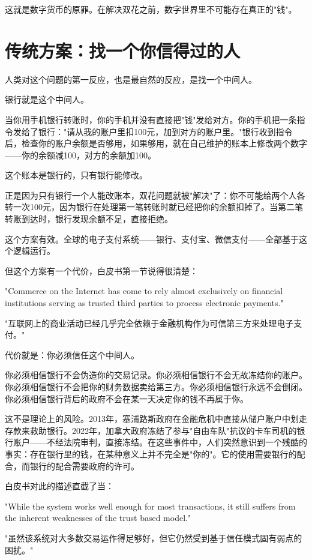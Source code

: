 \documentclass[a4paper,12pt,openany]{ctexbook}
\newenvironment{quoting}{%
  \par\vspace{0.5em}%
  \begin{list}{}{%
    \setlength{\leftmargin}{2em}%
    \setlength{\rightmargin}{2em}%
    \setlength{\parsep}{0.3em}%
    \setlength{\itemsep}{0pt}%
    \setlength{\topsep}{0pt}%
  }%
  \item\relax
}{%
  \end{list}%
  \par\vspace{0.5em}%
}
\begin{document}
这就是数字货币的原罪。在解决双花之前，数字世界里不可能存在真正的"钱"。


\section*{传统方案：找一个你信得过的人}


人类对这个问题的第一反应，也是最自然的反应，是找一个中间人。

银行就是这个中间人。

当你用手机银行转账时，你的手机并没有直接把"钱"发给对方。你的手机把一条指令发给了银行："请从我的账户里扣100元，加到对方的账户里。"银行收到指令后，检查你的账户余额是否够用，如果够用，就在自己维护的账本上修改两个数字——你的余额减100，对方的余额加100。

这个账本是银行的，只有银行能修改。

正是因为只有银行一个人能改账本，双花问题就被"解决"了：你不可能给两个人各转一次100元，因为银行在处理第一笔转账时就已经把你的余额扣掉了。当第二笔转账到达时，银行发现余额不足，直接拒绝。

这个方案有效。全球的电子支付系统——银行、支付宝、微信支付——全部基于这个逻辑运行。

但这个方案有一个代价，白皮书第一节说得很清楚：


\begin{quoting}
\small
"Commerce on the Internet has come to rely almost exclusively on financial institutions serving as trusted third parties to process electronic payments."

"互联网上的商业活动已经几乎完全依赖于金融机构作为可信第三方来处理电子支付。"
\end{quoting}


代价就是：你必须信任这个中间人。

你必须相信银行不会伪造你的交易记录。你必须相信银行不会无故冻结你的账户。你必须相信银行不会把你的财务数据卖给第三方。你必须相信银行永远不会倒闭。你必须相信银行背后的政府不会在某一天决定你的钱不再属于你。

这不是理论上的风险。2013年，塞浦路斯政府在金融危机中直接从储户账户中划走存款来救助银行。2022年，加拿大政府冻结了参与"自由车队"抗议的卡车司机的银行账户——不经法院审判，直接冻结。在这些事件中，人们突然意识到一个残酷的事实：存在银行里的钱，在某种意义上并不完全是"你的"。它的使用需要银行的配合，而银行的配合需要政府的许可。

白皮书对此的描述直截了当：


\begin{quoting}
\small
"While the system works well enough for most transactions, it still suffers from the inherent weaknesses of the trust based model."

"虽然该系统对大多数交易运作得足够好，但它仍然受到基于信任模式固有弱点的困扰。"
\end{quoting}
\end{document}
